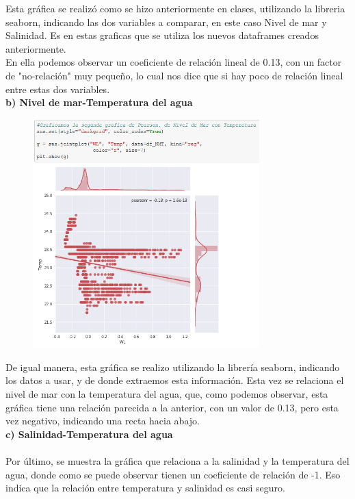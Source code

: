 \documentclass[12pt]{article}
\begin{document}
Esta gráfica se realizó como se hizo anteriormente en clases, utilizando la libreria seaborn, indicando las dos variables a comparar, en este caso Nivel de mar y Salinidad. Es en estas graficas que se utiliza los nuevos dataframes creados anteriormente. \\

En ella podemos observar un coeficiente de relación lineal de 0.13, con un factor de "no-relación" muy pequeño, lo cual nos dice que si hay poco de relación lineal entre estas dos variables. \\ 

\noindent\textbf {b) Nivel de mar-Temperatura del agua} \\
\begin{figure}[h]
    \centering
\includegraphics[width=3.45in]{Pearson2.png}
\end{figure}

De igual manera, esta gráfica se realizo utilizando la librería seaborn, indicando los datos a usar, y de donde extraemos esta información. Esta vez se relaciona el nivel de mar con la temperatura del agua, que, como podemos observar, esta gráfica tiene una relación parecida a la anterior, con un valor de 0.13, pero esta vez negativo, indicando una recta hacia abajo. \\

\noindent\textbf {c) Salinidad-Temperatura del agua} \\ \\
Por último, se muestra la gráfica que relaciona a la salinidad y la temperatura del agua, donde como se puede observar tienen un coeficiente de relación de -1. Eso indica que la relación entre temperatura y salinidad es casi seguro. \\
\end{document}
